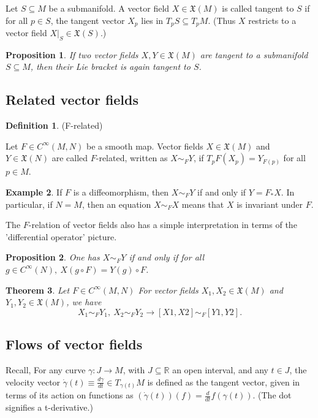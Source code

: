 \documentclass{article}
\newtheorem{theorem}{Theorem}[section]
\newtheorem{proposition}{Proposition}[theorem]
\theoremstyle{definition}
\newtheorem{defn}[theorem]{Definition}
\newtheorem{example}[theorem]{Example}
\newenvironment{definition}
  {\vspace{8pt}\begin{mdframed}[backgroundcolor=blueish]\begin{defn}}
  {\end{defn}\end{mdframed}\vspace{4pt}}
\begin{document}
Let $S \subseteq M$ be a submanifold. A vector field $X \in \mathfrak X(M)$ is called tangent to $S$ if for all $p \in S$, the tangent vector $X_p$ lies in $T_pS \subseteq T_pM$. (Thus $X$ restricts to a vector field $X|_S \in \mathfrak X(S)$.)

\begin{proposition}
If two vector fields $X,Y \in \mathfrak X(M)$ are tangent to a submanifold $S \subseteq M$, then their Lie bracket is again tangent to $S$.
\end{proposition}

\subsection{Related vector fields}

\begin{definition} (F-related)

Let $F \in C^\infty(M,N)$ be a smooth map. Vector fields $X \in \mathfrak X(M)$ and $Y \in \mathfrak X(N)$ are called $F$-related, written as $X \sim_F Y$, if $T_pF(X_p) = Y_{F(p)}$ for all $p \in M$.

\end{definition}

\begin{example}

If $F$ is a diffeomorphism, then $X \sim_F Y$ if and only if $Y = F_* X$. In particular, if $N = M$, then an equation $X \sim_F X$ means that $X$ is invariant under $F$.

\end{example}

The $F$-relation of vector fields also has a simple interpretation in terms of the 'differential operator' picture.

\begin{proposition}
One has $X \sim_F Y$ if and only if for all $g \in C^\infty(N), \ X(g \circ F) = Y(g) \circ F$.

\end{proposition}

\begin{theorem}

Let $F \in C ^\infty(M,N)$ For vector fields $X_1,X_2 \in \mathfrak X(M)$ and $Y_1,Y_2 \in \mathfrak X(M)$, we have 
\[
    X_1 \sim_F Y_1, \ X_2 \sim_F Y_2 \rightarrow [X1,X2] \sim_F [Y1,Y2].
\]
\end{theorem}

\subsection{Flows of vector fields}
Recall, For any curve $\gamma : J \rightarrow M$, with $J \subseteq \mathbb R$ an open interval, and any $t \in J$, the velocity vector $\dot{\gamma}(t) \equiv \frac{d\gamma}{dt} \in T_{\gamma(t)}M$ is defined as the tangent vector, given in terms of its action on functions as $(\dot{\gamma}(t))(f) = \frac{d}{dt} f(\gamma(t))$. (The dot signifies a t-derivative.)
\end{document}
